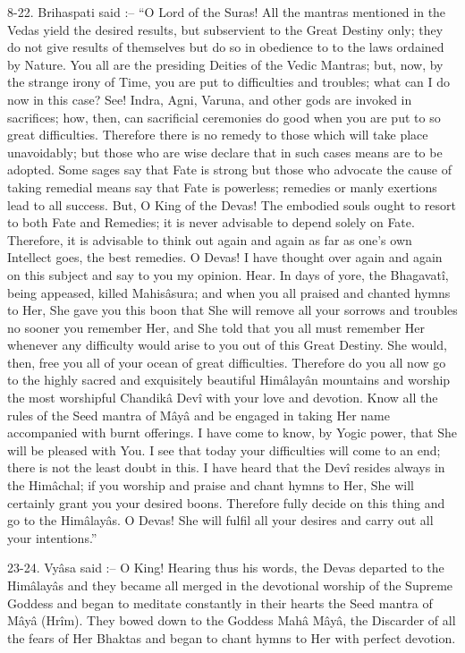 8-22. Brihaspati said :-- ``O Lord of the Suras! All the mantras mentioned in the Vedas yield the desired results, but subservient to the Great Destiny only; they do not give results of themselves but do so in obedience to to the laws ordained by Nature. You all are the presiding Deities of the Vedic Mantras; but, now, by the strange irony of Time, you are put to difficulties and troubles; what can I do now in this case? See! Indra, Agni, Varuna, and other gods are invoked in sacrifices; how, then, can sacrificial ceremonies do good when you are put to so great difficulties. Therefore there is no remedy to those which will take place unavoidably; but those who are wise declare that in such cases means are to be adopted. Some sages say that Fate is strong but those who advocate the cause of taking remedial means say that Fate is powerless; remedies or manly exertions lead to all success. But, O King of the Devas! The embodied souls ought to resort to both Fate and Remedies; it is never advisable to depend solely on Fate. Therefore, it is advisable to think out again and again as far as one's own Intellect goes, the best remedies. O Devas! I have thought over again and again on this subject and say to you my opinion. Hear. In days of yore, the Bhagavat\^i, being appeased, killed Mahis\^asura; and when you all praised and chanted hymns to Her, She gave you this boon that She will remove all your sorrows and troubles no sooner you remember Her, and She told that you all must remember Her whenever any difficulty would arise to you out of this Great Destiny. She would, then, free you all of your ocean of great difficulties. Therefore do you all now go to the highly sacred and exquisitely beautiful Him\^alay\^an mountains and worship the most worshipful Chandik\^a Dev\^i with your love and devotion. Know all the rules of the Seed mantra of M\^ay\^a and be engaged in taking Her name accompanied with burnt offerings. I have come to know, by Yogic power, that She will be pleased with You. I see that today your difficulties will come to an end; there is not the least doubt in this. I have heard that the Dev\^i resides always in the Him\^achal; if you worship and praise and chant hymns to Her, She will certainly grant you your desired boons. Therefore fully decide on this thing and go to the Him\^alay\^as. O Devas! She will fulfil all your desires and carry out all your intentions.''

23-24. Vy\^asa said :-- O King! Hearing thus his words, the Devas departed to the Him\^alay\^as and they became all merged in the devotional worship of the Supreme Goddess and began to meditate constantly in their hearts the Seed mantra of M\^ay\^a (Hr\^im). They bowed down to the Goddess Mah\^a M\^ay\^a, the Discarder of all the fears of Her Bhaktas and began to chant hymns to Her with perfect devotion.

